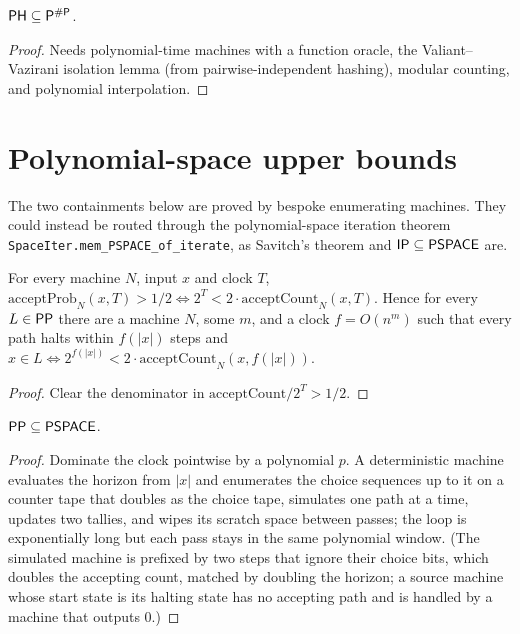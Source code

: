 \begin{theorem}[Toda]
  \label{thm:randomness-toda}
  \notready
  $\mathsf{PH} \subseteq \mathsf{P}^{\#\mathsf{P}}$.
\end{theorem}
\begin{proof}
  Needs polynomial-time machines with a function oracle, the Valiant--Vazirani
  isolation lemma (from pairwise-independent hashing), modular counting, and
  polynomial interpolation.
\end{proof}

\section{Polynomial-space upper bounds}

The two containments below are proved by bespoke enumerating machines. They
could instead be routed through the polynomial-space iteration theorem
\texttt{SpaceIter.mem\_PSPACE\_of\_iterate}, as Savitch's theorem and
$\mathsf{IP} \subseteq \mathsf{PSPACE}$ are.

\begin{lemma}
  \label{lem:randomness-pp-integer}
  \leanok
  For every machine $N$, input $x$ and clock $T$,
  $\mathrm{acceptProb}_N(x, T) > 1/2 \iff 2^T < 2 \cdot
  \mathrm{acceptCount}_N(x, T)$. Hence for every $L \in \mathsf{PP}$ there are a
  machine $N$, some $m$, and a clock $f = O(n^m)$ such that every path halts
  within $f(|x|)$ steps and
  $x \in L \iff 2^{f(|x|)} < 2 \cdot \mathrm{acceptCount}_N(x, f(|x|))$.
\end{lemma}
\begin{proof}
  \leanok
  Clear the denominator in $\mathrm{acceptCount}/2^T > 1/2$.
\end{proof}

\begin{theorem}
  \label{thm:randomness-pp-pspace}
  \leanok
  $\mathsf{PP} \subseteq \mathsf{PSPACE}$.
\end{theorem}
\begin{proof}
  \leanok
  Dominate the clock pointwise by a polynomial $p$. A deterministic machine
  evaluates the horizon from $|x|$ and enumerates the choice sequences up to it
  on a counter tape that doubles as the choice tape, simulates one path at a
  time, updates two tallies, and wipes its scratch space between passes; the
  loop is exponentially long but each pass stays in the same polynomial window.
  (The simulated machine is prefixed by two steps that ignore their choice bits,
  which doubles the accepting count, matched by doubling the horizon; a source
  machine whose start state is its halting state has no accepting path and is
  handled by a machine that outputs $0$.)
\end{proof}

